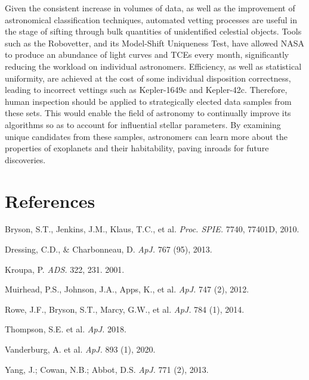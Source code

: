 \documentclass[onecolumn, 12pt]{article}
\begin{document}
Given the consistent increase in volumes of data, as well as the improvement of astronomical classification techniques, automated vetting processes are useful in the  stage of sifting through bulk quantities of unidentified celestial objects. Tools such as the Robovetter, and its Model-Shift Uniqueness Test, have allowed NASA to produce an abundance of light curves and TCEs every month, significantly reducing the workload on individual astronomers. Efficiency, as well as statistical uniformity, are achieved at the cost of some individual disposition correctness, leading to incorrect vettings such as Kepler-1649c and Kepler-42c. Therefore, human inspection should be applied to strategically elected data samples from these sets. This would enable the field of astronomy to continually improve its algorithms so as to account for influential stellar parameters. By examining unique candidates from these samples, astronomers can learn more about the properties of exoplanets and their habitability, paving inroads for future discoveries.

\section*{References}

Bryson, S.T., Jenkins, J.M., Klaus, T.C., et al.  \textit{Proc. SPIE.} 7740, 77401D, 2010.

\medskip

\noindent Dressing, C.D., \& Charbonneau, D.  \textit{ApJ.} 767 (95), 2013.

\medskip

\noindent Kroupa, P.  \textit{ADS.} 322, 231. 2001.

\medskip

\noindent Muirhead, P.S., Johnson, J.A., Apps, K., et al.  \textit{ApJ.} 747 (2), 2012.

\medskip

\noindent Rowe, J.F., Bryson, S.T., Marcy, G.W., et al.  \textit{ApJ.} 784 (1), 2014.

\medskip

\noindent Thompson, S.E. et al.  \textit{ApJ.} 2018.

\medskip

\noindent Vanderburg, A. et al.  \textit{ApJ.} 893 (1), 2020.

\medskip

\noindent Yang, J.; Cowan, N.B.; Abbot, D.S.  \textit{ApJ.} 771 (2), 2013.
\end{document}

